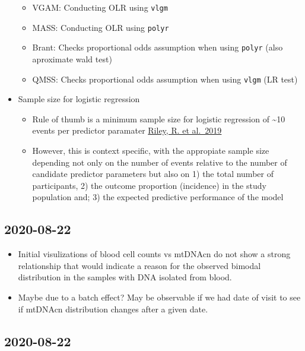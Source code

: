 \documentclass[]{book}
\providecommand{\tightlist}{%
  \setlength{\itemsep}{0pt}\setlength{\parskip}{0pt}}
\begin{document}
\begin{itemize}
  \begin{itemize}
  \tightlist
  \item
    VGAM: Conducting OLR using \texttt{vlgm}
  \item
    MASS: Conducting OLR using \texttt{polyr}
  \item
    Brant: Checks proportional odds assumption when using \texttt{polyr} (also aproximate wald test)
  \item
    QMSS: Checks proportional odds assumption when using \texttt{vlgm} (LR test)
  \end{itemize}
\item
  Sample size for logistic regression

  \begin{itemize}
  \tightlist
  \item
    Rule of thumb is a minimum sample size for logistic regression of \textasciitilde{}10 events per predictor paramater \href{https://dx.doi.org/10.1002/sim.7992}{Riley, R. et al.~2019}
  \item
    However, this is context specific, with the appropiate sample size depending not only on the number of events relative to the number of candidate predictor parameters but also on 1) the total number of participants, 2) the outcome proportion (incidence) in the study population and; 3) the expected predictive performance of the model
  \end{itemize}
\end{itemize}

\hypertarget{section-3}{%
\subsection{2020-08-22}\label{section-3}}

\begin{itemize}
\tightlist
\item
  Initial visulizations of blood cell counts vs mtDNAcn do not show a strong relationship that would indicate a reason for the observed bimodal distribution in the samples with DNA isolated from blood.
\item
  Maybe due to a batch effect? May be observable if we had date of visit to see if mtDNAcn distribution changes after a given date.
\end{itemize}

\hypertarget{section-4}{%
\subsection{2020-08-22}\label{section-4}}
\end{document}
